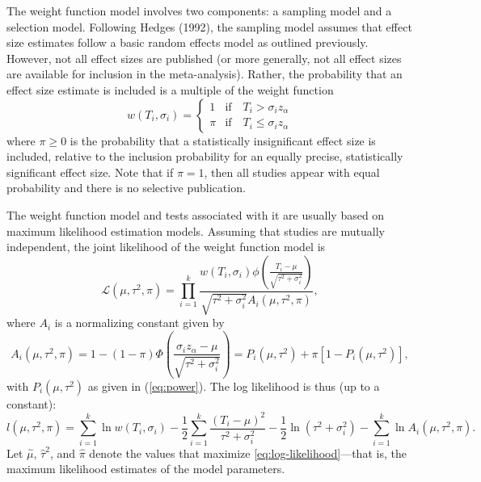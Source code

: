 \documentclass[man,floatsintext]{apa6}
\begin{document}
The weight function model involves two components: a sampling model and a selection model. Following Hedges (1992), the sampling model assumes that effect size estimates follow a basic random effects model as outlined previously. However, not all effect sizes are published (or more generally, not all effect sizes are available for inclusion in the meta-analysis). Rather, the probability that an effect size estimate is included is a multiple of the weight function
\begin{equation}
w(T_i, \sigma_i) = \begin{cases} 1 & \text{if} \quad T_i > \sigma_i z_\alpha \\ \pi & \text{if} \quad T_i \leq \sigma_i z_\alpha \end{cases}
\label{eq:weight-function}
\end{equation}
where \(\pi \geq 0\) is the probability that a statistically insignificant effect size is included, relative to the inclusion probability for an equally precise, statistically significant effect size.
Note that if \(\pi = 1\), then all studies appear with equal probability and there is no selective publication.

The weight function model and tests associated with it are usually based on maximum likelihood estimation models.
Assuming that studies are mutually independent, the joint likelihood of the weight function model is
\begin{equation}
\mathcal{L}(\mu, \tau^2, \pi) = \prod_{i=1}^k \frac{w(T_i, \sigma_i) \phi\left(\frac{T_i - \mu}{\sqrt{\tau^2 + \sigma_i^2}}\right)}{\sqrt{\tau^2 + \sigma_i^2} A_i(\mu, \tau^2, \pi)},
\label{eq:Likelihood}
\end{equation}
where \(A_i\) is a normalizing constant given by
\[
A_i(\mu, \tau^2, \pi) = 1 - (1 - \pi)\Phi\left( \frac{\sigma_i z_\alpha - \mu}{\sqrt{\tau^2 + \sigma_i^2}}\right) = P_i(\mu, \tau^2) + \pi \left[1 - P_i(\mu, \tau^2)\right],
\]
with \(P_i(\mu, \tau^2)\) as given in (\ref{eq:power}). The log likelihood is thus (up to a constant):
\begin{equation}
l(\mu, \tau^2, \pi) = \sum_{i=1}^k \ln w(T_i, \sigma_i) - \frac{1}{2} \sum_{i=1}^k \frac{(T_i - \mu)^2}{\tau^2 + \sigma_i^2} - \frac{1}{2} \ln(\tau^2 + \sigma_i^2) - \sum_{i=1}^k \ln A_i(\mu, \tau^2, \pi).
\label{eq:log-likelihood}
\end{equation}
Let \(\hat\mu\), \(\hat\tau^2\), and \(\hat\pi\) denote the values that maximize \eqref{eq:log-likelihood}---that is, the maximum likelihood estimates of the model parameters.
\end{document}
